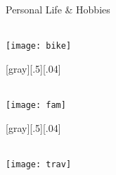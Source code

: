 \begin{frame}[t]{Personal Life \& Hobbies}
%
  \begin{minipage}[c][.8\textheight][t]{.3\textwidth}\centering
    \\[5ex]
    \texttt{[image: bike]}
  \end{minipage}[gray][.5][.04]
%
  \begin{minipage}[c][.8\textheight][t]{.29\textwidth}\centering
    \\[5ex]
  \texttt{[image: fam]}
  \end{minipage}[gray][.5][.04]
%
  \begin{minipage}[c][.8\textheight][t]{.3\textwidth}\centering
    \\[5ex]
    \texttt{[image: trav]}
  \end{minipage}
%
\end{frame}
